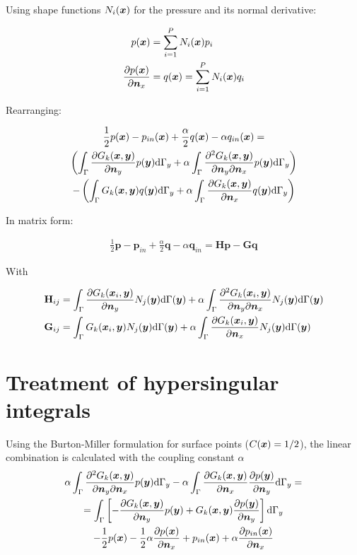 \documentclass[a4paper, 10pt]{article}
\newcommand{\td}{\mathrm{d}}
\newcommand{\sx}{\bm{\mathnormal{x}}}
\newcommand{\sy}{\bm{\mathnormal{y}}}
\newcommand{\sn}{\bm{\mathnormal{n}}}
\newcommand{\bp}{\mathbf{p}}
\newcommand{\bq}{\mathbf{q}}
\newcommand{\bH}{\mathbf{H}}
\newcommand{\bG}{\mathbf{G}}
\begin{document}
Using shape functions $N_i(\sx)$ for the pressure and its normal derivative:

\begin{align}
	p(\sx) & = \sum\limits_{i=1}^P N_i(\sx)p_i \\
	\frac{\partial p(\sx)}{\partial \sn_x} & = q(\sx) = \sum\limits_{i=1}^P N_i(\sx)q_i
\end{align}

Rearranging:

\begin{multline}
	\frac{1}{2} p (\sx)
	-
	p_{in}(\sx)
	+
	\frac{\alpha}{2} q(\sx)
	-
	\alpha q_{in}(\sx)
	= \\
	\left(
	\int_{\Gamma} \frac{\partial{G}_k (\sx, \sy)}{\partial \sn_y} p(\sy) \td \Gamma_y
	+
	\alpha \int_{\Gamma}
	\frac{\partial^2{G}_k (\sx, \sy)}{\partial \sn_y \partial \sn_x} p(\sy) \td \Gamma_y
	\right)
	\\
	-
	\left(
	\int_{\Gamma} G_k(\sx,\sy) q(\sy) \td \Gamma_y
	+
	\alpha \int_{\Gamma}
	\frac{\partial G_k(\sx,\sy)}{\partial \sn_x}q(\sy) \td \Gamma_y
	\right)
\end{multline}

In matrix form:

\begin{align}
	\frac{1}{2} \mathbf{p} - \mathbf{p}_{in} + \frac{\alpha}{2} \mathbf{q} - \alpha \mathbf{q}_{in} = \bH \bp - \bG \bq
\end{align}

With

\begin{align}
	\bH_{ij}
	& = \int_{\Gamma}\frac{\partial{G}_k (\sx_i, \sy)}{\partial \sn_y} N_j(\sy) \td \Gamma(\sy)
	+ \alpha \int_\Gamma \frac{\partial^2{G}_k (\sx_i, \sy)}{\partial \sn_y \partial \sn_x} N_j(\sy) \td \Gamma(\sy) \nonumber \\
	\bG_{ij}
	& = \int_{\Gamma} G_k(\sx_i,\sy) N_j(\sy) \td \Gamma(\sy)
	+ \alpha \int_\Gamma \frac{\partial{G}_k (\sx_i, \sy)}{\partial \sn_x} N_j(\sy) \td \Gamma(\sy)
\end{align}




\section{Treatment of hypersingular integrals}

Using the Burton-Miller formulation for surface points ($C(\sx) = 1/2$), the linear combination is calculated with the coupling constant $\alpha$
%
\begin{multline}
	\alpha \int_\Gamma \frac{\partial^2{G}_k (\sx, \sy)}{\partial \sn_y \partial \sn_x} p(\sy) \td \Gamma_y -
	\alpha \int_\Gamma \frac{\partial{G}_k (\sx, \sy)}{\partial \sn_x} \frac{\partial p(\sy)}{\partial \sn_y} \td \Gamma_y = \\
	 = \int_{\Gamma}\left[-\frac{\partial{G}_k (\sx, \sy)}{\partial \sn_y} p(\sy) + G_k(\sx,\sy)\frac{\partial p(\sy)}{\partial \sn_y}\right] \td \Gamma_y \\
	- \frac{1}{2} p(\sx) - \frac{1}{2}\alpha \frac{ \partial p(\sx)}{\partial \sn_x} + p_{in}(\sx) + \alpha \frac{\partial p_{in}(\sx)}{\partial \sn_x}
\end{multline}
\end{document}
